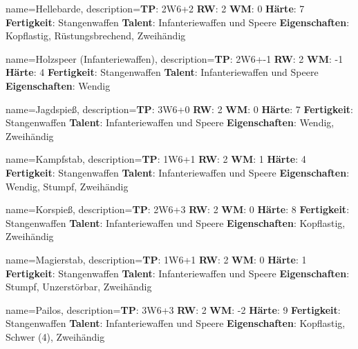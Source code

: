 {
    name={Hellebarde},
    description={\textbf{TP}: 2W6+2 \textbf{RW}: 2 \textbf{WM}: 0 \textbf{Härte}: 7        \textbf{Fertigkeit}: Stangenwaffen \textbf{Talent}: Infanteriewaffen und Speere \textbf{{Eigenschaften}}: Kopflastig, Rüstungsbrechend, Zweihändig}
}



{
    name={Holzspeer (Infanteriewaffen)},
    description={\textbf{TP}: 2W6+-1 \textbf{RW}: 2 \textbf{WM}: -1 \textbf{Härte}: 4        \textbf{Fertigkeit}: Stangenwaffen \textbf{Talent}: Infanteriewaffen und Speere \textbf{{Eigenschaften}}: Wendig}
}



{
    name={Jagdspieß},
    description={\textbf{TP}: 3W6+0 \textbf{RW}: 2 \textbf{WM}: 0 \textbf{Härte}: 7        \textbf{Fertigkeit}: Stangenwaffen \textbf{Talent}: Infanteriewaffen und Speere \textbf{{Eigenschaften}}: Wendig, Zweihändig}
}



{
    name={Kampfstab},
    description={\textbf{TP}: 1W6+1 \textbf{RW}: 2 \textbf{WM}: 1 \textbf{Härte}: 4        \textbf{Fertigkeit}: Stangenwaffen \textbf{Talent}: Infanteriewaffen und Speere \textbf{{Eigenschaften}}: Wendig, Stumpf, Zweihändig}
}



{
    name={Korspieß},
    description={\textbf{TP}: 2W6+3 \textbf{RW}: 2 \textbf{WM}: 0 \textbf{Härte}: 8        \textbf{Fertigkeit}: Stangenwaffen \textbf{Talent}: Infanteriewaffen und Speere \textbf{{Eigenschaften}}: Kopflastig, Zweihändig}
}



{
    name={Magierstab},
    description={\textbf{TP}: 1W6+1 \textbf{RW}: 2 \textbf{WM}: 0 \textbf{Härte}: 1        \textbf{Fertigkeit}: Stangenwaffen \textbf{Talent}: Infanteriewaffen und Speere \textbf{{Eigenschaften}}: Stumpf, Unzerstörbar, Zweihändig}
}



{
    name={Pailos},
    description={\textbf{TP}: 3W6+3 \textbf{RW}: 2 \textbf{WM}: -2 \textbf{Härte}: 9        \textbf{Fertigkeit}: Stangenwaffen \textbf{Talent}: Infanteriewaffen und Speere \textbf{{Eigenschaften}}: Kopflastig, Schwer (4), Zweihändig}
}



